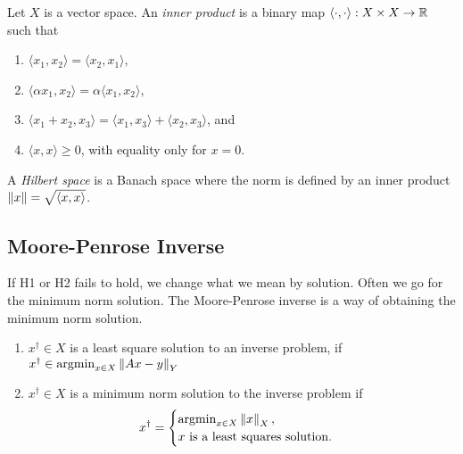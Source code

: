 \documentclass[12pt]{article}
\begin{document}
\begin{definition}
    Let $X$ is a vector space. An \textit{inner product} is a binary map $\langle\cdot,\cdot\rangle: X\times X \to \mathbb{R}$ such that
    \begin{enumerate}[label=(\alph*)]
        \item $\langle x_1,x_2\rangle = \langle x_2,x_1\rangle$,
        \item $\langle\alpha x_1,x_2\rangle = \alpha\langle x_1,x_2\rangle$,
        \item $\langle x_1+x_2,x_3\rangle = \langle x_1,x_3\rangle+\langle x_2,x_3\rangle$, and
        \item $\langle x,x\rangle \geq 0$, with equality only for $x=0$.
    \end{enumerate}
\end{definition}

\begin{definition}
    A \textit{Hilbert space} is a Banach space where the norm is defined by an inner product $\left\lVert x\right\rVert = \sqrt{\left\langle x, x\right\rangle}$.
\end{definition}

\subsection{Moore-Penrose Inverse}
If H1 or H2 fails to hold, we change what we mean by solution. Often we go for the minimum norm solution. The Moore-Penrose inverse is a way of obtaining the minimum norm solution.

\begin{definition}
    \begin{enumerate}[label=(\alph*)]
        \item $x^\dagger \in X$ is a least square solution to an inverse problem, if $x^\dagger \in \operatorname{argmin}_{x\in X} \left\lVert Ax-y\right\rVert_Y$
        \item $x^\dagger \in X$ is a minimum norm solution to the inverse problem if 
        \begin{equation*}
            x^\dagger =\begin{cases}
                \operatorname{argmin}_{x\in X} \left\lVert x\right\rVert_X,\\
                x \text{ is a least squares solution}.
            \end{cases}
        \end{equation*}
    \end{enumerate}
\end{definition}
\end{document}
